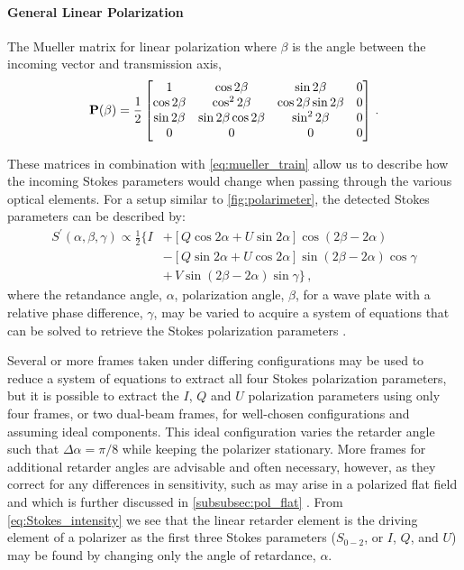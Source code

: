 \paragraph{General Linear Polarization}
The Mueller matrix for linear polarization where $\beta$ is the angle between the incoming vector and transmission axis,
\begin{equation} \label{matrix:polarizer}
    \mathbf{P}(\beta) = \frac{1}{2}
    \begin{bmatrix}
        1            & \cos 2 \beta              & \sin 2 \beta              & 0 \\
        \cos 2 \beta & \cos^{2} 2 \beta          & \cos 2 \beta \sin 2 \beta & 0 \\
        \sin 2 \beta & \sin 2 \beta \cos 2 \beta & \sin^{2} 2 \beta          & 0 \\
        0            & 0                         & 0                         & 0 \\
    \end{bmatrix}\,.
\end{equation}

These matrices in combination with \autoref{eq:mueller_train} allow us to describe how the incoming Stokes parameters would change when passing through the various optical elements.
For a setup similar to \autoref{fig:polarimeter}, the detected Stokes parameters can be described by:
\begin{equation} \label{eq:Stokes_intensity}
    \begin{split}
        S^{\prime}(\alpha, \beta, \gamma) \propto \frac{1}{2} \{ I & + [Q \cos2\alpha + U \sin2\alpha] \cos(2\beta - 2\alpha) \\
        & - [Q \sin2\alpha + U \cos2\alpha] \sin(2\beta - 2\alpha) \cos\gamma\\
        & + \,V \sin(2\beta - 2\alpha)\sin\gamma \}\,,
    \end{split}
\end{equation}
where the retandance angle, $\alpha$, polarization angle, $\beta$, for a wave plate with a relative phase difference, $\gamma$, may be varied to acquire a system of equations that can be solved to retrieve the Stokes polarization parameters \citep{waveplate_in_specpol}.

Several or more frames taken under differing configurations may be used to reduce a system of equations to extract all four Stokes polarization parameters, but it is possible to extract the $I$, $Q$ and $U$ polarization parameters using only four frames, or two dual-beam frames, for well-chosen configurations and assuming ideal components.
This ideal configuration varies the retarder angle such that $\Delta\alpha = \pi / 8$ while keeping the polarizer stationary.
More frames for additional retarder angles are advisable and often necessary, however, as they correct for any differences in sensitivity, such as may arise in a polarized flat field and which is further discussed in \autoref{subsubsec:pol_flat} \citep{polarimetry_error}.
From \autoref{eq:Stokes_intensity} we see that the linear retarder element is the driving element of a polarizer as the first three Stokes parameters ($S_{0-2}$, or $I$, $Q$, and $U$) may be found by changing only the angle of retardance, $\alpha$.

